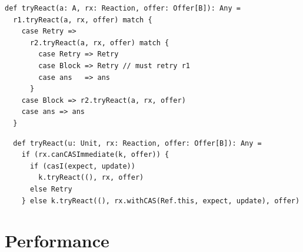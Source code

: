 \documentclass[preprint]{sigplanconf}
\begin{document}
\begin{lstlisting}
def tryReact(a: A, rx: Reaction, offer: Offer[B]): Any = 
  r1.tryReact(a, rx, offer) match {
    case Retry => 
      r2.tryReact(a, rx, offer) match {
        case Retry => Retry
        case Block => Retry // must retry r1
        case ans   => ans
      }
    case Block => r2.tryReact(a, rx, offer)
    case ans => ans
  }
\end{lstlisting}

\begin{lstlisting}
  def tryReact(u: Unit, rx: Reaction, offer: Offer[B]): Any = 
    if (rx.canCASImmediate(k, offer)) {
      if (casI(expect, update))
        k.tryReact((), rx, offer)
      else Retry
    } else k.tryReact((), rx.withCAS(Ref.this, expect, update), offer)
\end{lstlisting}


\section{Performance}
\label{sec:performance}
\end{document}
